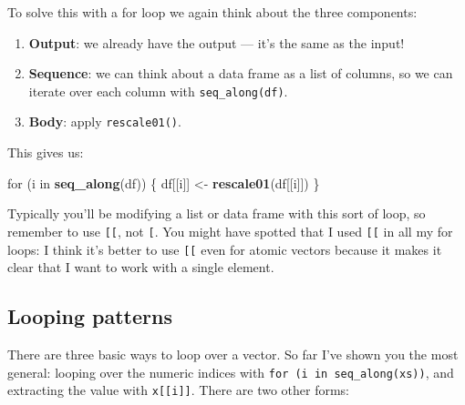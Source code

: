 \documentclass[]{book}
\newenvironment{Shaded}{\begin{snugshade}}{\end{snugshade}}
\newcommand{\KeywordTok}[1]{\textcolor[rgb]{0.13,0.29,0.53}{\textbf{{#1}}}}
\newcommand{\StringTok}[1]{\textcolor[rgb]{0.31,0.60,0.02}{{#1}}}
\newcommand{\NormalTok}[1]{{#1}}
\begin{document}
To solve this with a for loop we again think about the three components:

\begin{enumerate}
\def\labelenumi{\arabic{enumi}.}
\item
  \textbf{Output}: we already have the output --- it's the same as the
  input!
\item
  \textbf{Sequence}: we can think about a data frame as a list of
  columns, so we can iterate over each column with
  \texttt{seq\_along(df)}.
\item
  \textbf{Body}: apply \texttt{rescale01()}.
\end{enumerate}

This gives us:

\begin{Shaded}
\begin{Highlighting}[]
\NormalTok{for (i in }\KeywordTok{seq_along}\NormalTok{(df)) \{}
  \NormalTok{df[[i]] <-}\StringTok{ }\KeywordTok{rescale01}\NormalTok{(df[[i]])}
\NormalTok{\}}
\end{Highlighting}
\end{Shaded}

Typically you'll be modifying a list or data frame with this sort of
loop, so remember to use \texttt{{[}{[}}, not \texttt{{[}}. You might
have spotted that I used \texttt{{[}{[}} in all my for loops: I think
it's better to use \texttt{{[}{[}} even for atomic vectors because it
makes it clear that I want to work with a single element.

\subsection{Looping patterns}\label{looping-patterns}

There are three basic ways to loop over a vector. So far I've shown you
the most general: looping over the numeric indices with
\texttt{for\ (i\ in\ seq\_along(xs))}, and extracting the value with
\texttt{x{[}{[}i{]}{]}}. There are two other forms:
\end{document}
